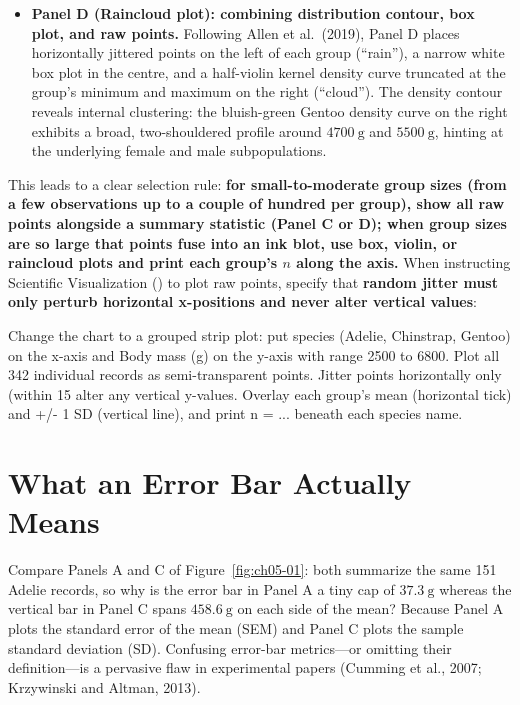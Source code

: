 \begin{itemize}
\item \textbf{Panel D (Raincloud plot): combining distribution contour, box plot, and raw points.} Following Allen et al.\ (2019), Panel D places horizontally jittered points on the left of each group (``rain''), a narrow white box plot in the centre, and a half-violin kernel density curve truncated at the group's minimum and maximum on the right (``cloud''). The density contour reveals internal clustering: the bluish-green Gentoo density curve on the right exhibits a broad, two-shouldered profile around $4700\ \text{g}$ and $5500\ \text{g}$, hinting at the underlying female and male subpopulations.
\end{itemize}

This leads to a clear selection rule: \textbf{for small-to-moderate group sizes (from a few observations up to a couple of hundred per group), show all raw points alongside a summary statistic (Panel C or D); when group sizes are so large that points fuse into an ink blot, use box, violin, or raincloud plots and print each group's $n$ along the axis.} When instructing \scidraw{} Scientific Visualization () to plot raw points, specify that \textbf{random jitter must only perturb horizontal x-positions and never alter vertical values}:

\begin{Prompt}
Change the chart to a grouped strip plot: put species (Adelie, Chinstrap, Gentoo)
on the x-axis and Body mass (g) on the y-axis with range 2500 to 6800.
Plot all 342 individual records as semi-transparent points. Jitter points
horizontally only (within 15%
alter any vertical y-values. Overlay each group's mean (horizontal tick) and
+/- 1 SD (vertical line), and print n = ... beneath each species name.
\end{Prompt}

\section{What an Error Bar Actually Means}

Compare Panels A and C of Figure~\ref{fig:ch05-01}: both summarize the same 151 Adelie records, so why is the error bar in Panel A a tiny cap of $37.3\ \text{g}$ whereas the vertical bar in Panel C spans $458.6\ \text{g}$ on each side of the mean? Because Panel A plots the standard error of the mean (SEM) and Panel C plots the sample standard deviation (SD). Confusing error-bar metrics—or omitting their definition—is a pervasive flaw in experimental papers (Cumming et al., 2007; Krzywinski and Altman, 2013).


